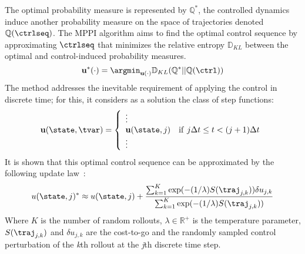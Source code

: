 The optimal probability measure is represented by $\mathbb{Q}^*$, the controlled dynamics induce another probability measure on the space of trajectories denoted $\mathbb{Q}(\ctrlseq)$. The MPPI algorithm aims to find the optimal control sequence by approximating $\ctrlseq$ that minimizes the relative entropy $\mathbb{D}_{KL}$ between the optimal and control-induced probability measures.
%
\begin{equation}
    \mathbf{u}^{*}(\cdot)=\argmin_{\mathbf{u}(\cdot)}\mathbb{D}_{KL}(\mathbb{Q}^*||\mathbb{Q}(\ctrl))
\end{equation}
%
The method addresses the inevitable requirement of applying the control in discrete time; for this, it considers as a solution the class of step functions:
%
\begin{equation}
\mathbf{u}(\state,\tvar)={\left\{\begin{array}{l l}{\vdots}\\ {\mathbf{u}(\state,j)}&{{\mathrm{if~}}j\Delta t\leq t<(j+1)\Delta t}\\ {\vdots}\end{array}\right.}
\end{equation}
%
It is shown that this optimal control sequence can be approximated by the following update law~\cite{mppi_theory}:
%
\begin{equation}\label{eq:update_law}
u(\state,j)^{\ast}\approx u(\state,j)+{\frac{\sum_{k=1}^{K}\exp(-(1/\lambda)S(\traj_{j,k}))\delta u_{j,k}}{\sum_{k=1}^{K}\exp(-(1/\lambda)S(\traj_{j,k}))}}
\end{equation}
%
Where $K$ is the number of random rollouts, $\lambda \in \mathbb{R}^+$ is the temperature parameter, $S(\traj_{j,k})$ and $\delta u_{j,k}$ are the cost-to-go and the randomly sampled control perturbation of the \textit{k}th rollout at the \textit{j}th discrete time step.

